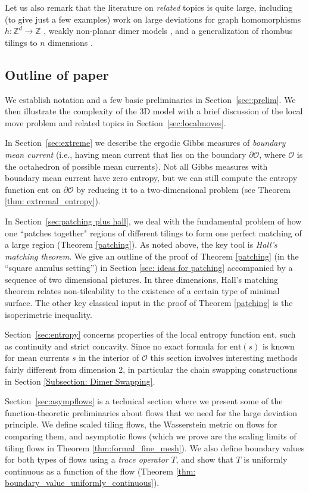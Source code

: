 \documentclass[11pt]{article}
\theoremstyle{remark}
\theoremstyle{definition}
\newcommand{\ent}{\text{ent}}
\newcommand{\mc}[1]{\mathcal{#1}}
\newcommand{\m}[1]{\mathbb{#1}}
\begin{document}
Let us also remark that the literature on {\em related} topics is quite large, including (to give just a few examples) work on large deviations for graph homomorphisms $h: \m Z^d\to \m Z$ \cite{KriegerMenzTassy}, weakly non-planar dimer models \cite{Giuliani2, wealkynonplanar}, and a generalization of rhombus tilings to $n$ dimensions \cite{LindaMooreNordahl, Lammers, arctic_oct_MC}.


\subsection{Outline of paper}
We establish notation and a few basic preliminaries in Section~\ref{sec::prelim}. We then illustrate the complexity of the 3D model with a brief discussion of the local move problem and related topics in Section~\ref{sec:localmoves}. 

In Section~\ref{sec:extreme} we describe the ergodic Gibbs measures of {\em boundary mean current} (i.e., having mean current that lies on the boundary $\partial \mathcal{O}$, where $\mathcal O$ is the octahedron of possible mean currents). Not all  Gibbs measures with boundary mean current have zero entropy, but we can still compute the entropy function $\ent$ on $\partial \mathcal O$ by reducing it to a two-dimensional problem (see Theorem \ref{thm: extremal_entropy}).

In Section~\ref{sec:patching plus hall}, we deal with the fundamental problem of how one ``patches together" regions of different tilings to form one perfect matching of a large region (Theorem \ref{patching}). As noted above, the key tool is \textit{Hall's matching theorem}. We give an outline of the proof of Theorem \ref{patching} (in the ``square annulus setting'') in Section \ref{sec: ideas for patching} accompanied by a sequence of two dimensional pictures. In three dimensions, Hall's matching theorem relates non-tileability to the existence of a certain type of minimal surface. The other key classical input in the proof of Theorem \ref{patching} is the isoperimetric inequality.

Section~\ref{sec:entropy} concerns properties of the local entropy function $\ent$, such as continuity and strict concavity. Since no exact formula for $\ent(s)$ is known for mean currents $s$ in the interior of $\mc O$ this section involves interesting methods fairly different from dimension 2, in particular the chain swapping constructions in Section \ref{Subsection: Dimer Swapping}. 


Section~\ref{sec:asympflows} is a technical section where we present some of the function-theoretic preliminaries about flows that we need for the large deviation principle. We define scaled tiling flows, the Wasserstein metric on flows for comparing them, and asymptotic flows (which we prove are the scaling limits of tiling flows in Theorem \ref{thm:formal_fine_mesh}). We also define boundary values for both types of flows using a \textit{trace operator} $T$, and show that $T$ is uniformly continuous as a function of the flow (Theorem \ref{thm: boundary_value_uniformly_continuous}). 
\end{document}
